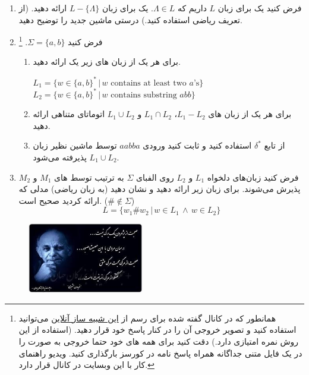 \documentclass{article}
\begin{document}
	\begin{enumerate}
		\item 
		فرض کنید یک  برای زبان $L$ داریم که $\Lambda \in L $. یک  برای زبان 
		 $L-\{\Lambda\}$
		  ارائه دهید. (از تعریف ریاضی  استفاده کنید.) درستی ماشین جدید را توضیح دهید.
		\item 
		فرض کنید $\Sigma = \{a, b \}$. 
		\footnote{
			همانطور که در کانال گفته شده برای رسم
		از
		\href{https://automatonsimulator.com/}{این شبیه ساز آنلاین}
		می‌توانید استفاده کنید و تصویر خروجی آن را در کنار پاسخ خود قرار دهید. (استفاده از این روش نمره امتیازی دارد.) دقت کنید برای همه های خود حتما خروجی به صورت
		را در یک فایل متنی جداگانه همراه پاسخ نامه در کورسز بارگذاری کنید. ویدیو راهنمای کار با این وبسایت در کانال قرار دارد.
		}
		\begin{enumerate}
			\item 
			برای هر یک از زبان های زیر یک  ارائه دهید.
			\begin{latin}
				$L_1 = \{w \in \{a,b\}^* \, | \, \text{$w$ contains at least two $a$'s} \} $
				\\
				$L_2 = \{w \in \{a,b\}^* \, | \, \text{$w$ contains substring $abb$} \} $
			\end{latin}
		
			\item 
			برای هر یک از زبان های 
			$L_1 - L_2$، 
			$L_1 \cap L_2$
			و
			$L_1 \cup L_2$
			اتوماتای متناهی ارائه دهید.
			\item 
			از تابع 
			$\delta^*$
			استفاده کنید و ثابت کنید ورودی $aabba$ توسط ماشین نظیر زبان $L_1 \cup L_2$ پذیرفته می‌شود.			
		\end{enumerate}
	

		\item 
		فرض کنید زبان‌های دلخواه $L_1$ و $L_2$ روی الفبای $\Sigma$ به ترتیب توسط های $M_1$ و $ M_2 $ پذیرش می‌شوند. برای زبان زیر  ارائه دهید و نشان دهید (به زبان ریاضی) مدلی که ارائه کردید صحیح است. ($ \# \notin \Sigma $)
		   	$$L = \{ w_1 \# w_2 \, | \, w  \in L_1 \, \land \, w \in L_2 \}$$
		
	\end{enumerate}
	
	\begin{figure}[h]
		\centering
		\includegraphics[width=0.45\textwidth]{image}
	\end{figure}
\end{document}
